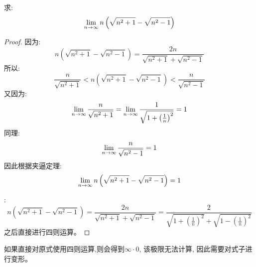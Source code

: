 \begin{example}
    求:
    \begin{equation*}
        \lim_{n \to \infty } n\left( \sqrt{n^2+1} - \sqrt{n^2 - 1}\right)
    \end{equation*}
\end{example}
\begin{proof}
    因为:
    \begin{equation*}
        n\left(\sqrt{n^2+1} - \sqrt{n^2 - 1}\right) = \frac{2n}{\sqrt{n^2+1}+\sqrt{n^2-1}}
    \end{equation*}
    所以:
    \begin{equation*}
        \frac{n}{\sqrt{n^2+1}} < n\left(\sqrt{n^2+1} - \sqrt{n^2 - 1}\right) < \frac{n}{\sqrt{n^2-1}}
    \end{equation*}
    又因为:
    \begin{equation*}
        \lim_{n \to \infty } \frac{n}{\sqrt{n^2+1}} = \lim_{n \to \infty } \frac{1}{\sqrt{1+\left(\frac{1}{n}\right)^2}} = 1
    \end{equation*}
    同理:
    \begin{equation*}
        \lim_{n \to \infty } \frac{n}{\sqrt{n^2-1}} = 1
    \end{equation*}
    因此根据夹逼定理:
    \begin{equation*}
        \lim_{n \to \infty } n\left( \sqrt{n^2+1} - \sqrt{n^2 - 1}\right) = 1
    \end{equation*}

    :
    \begin{equation*}
        n\left(\sqrt{n^2+1} - \sqrt{n^2 - 1}\right) = \frac{2n}{\sqrt{n^2+1}+\sqrt{n^2-1}} = \frac{2}{\sqrt{1+\left(\frac{1}{n}\right)^2}+\sqrt{1-\left(\frac{1}{n}\right)^2}}
    \end{equation*}
    之后直接进行四则运算。
\end{proof}
\begin{remark}
    如果直接对原式使用四则运算,则会得到$\infty \cdot 0$, 该极限无法计算, 因此需要对式子进行变形。
\end{remark}

